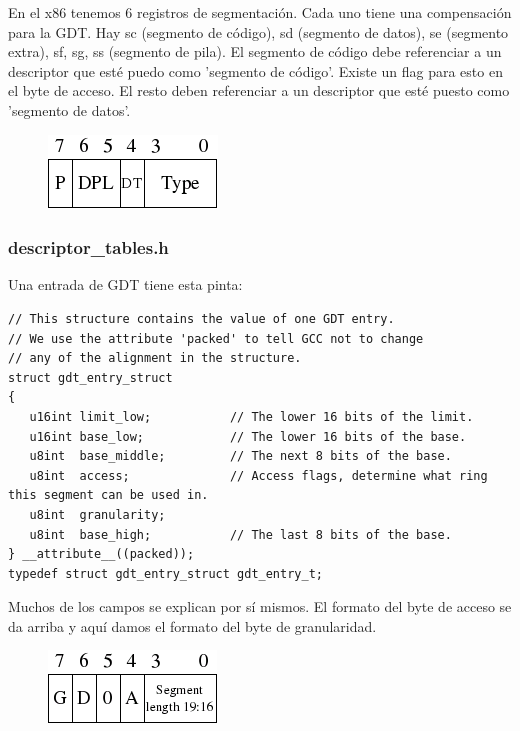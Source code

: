 \documentclass{report}
\begin{document}
En el x86 tenemos 6 registros de segmentaci\'{o}n. Cada uno tiene una compensaci\'{o}n para la GDT. Hay sc (segmento de c\'{o}digo), sd (segmento de datos), se (segmento extra), sf, sg, ss (segmento de pila). El segmento de c\'{o}digo debe referenciar a un descriptor que est\'{e} puedo como 'segmento de c\'{o}digo'. Existe un flag para esto en el byte de acceso. El resto deben referenciar a un descriptor que est\'{e} puesto como 'segmento de datos'.

\begin{figure}[htb]
\centering
\includegraphics[scale=0.5]{gdt_idt_gdt_format_2.png}
\end{figure}

\subsubsection{descriptor\_tables.h}

Una entrada de GDT tiene esta pinta:

\begin{lstlisting}
// This structure contains the value of one GDT entry.
// We use the attribute 'packed' to tell GCC not to change
// any of the alignment in the structure.
struct gdt_entry_struct
{
   u16int limit_low;           // The lower 16 bits of the limit.
   u16int base_low;            // The lower 16 bits of the base.
   u8int  base_middle;         // The next 8 bits of the base.
   u8int  access;              // Access flags, determine what ring this segment can be used in.
   u8int  granularity;
   u8int  base_high;           // The last 8 bits of the base.
} __attribute__((packed));
typedef struct gdt_entry_struct gdt_entry_t;
\end{lstlisting}

Muchos de los campos se explican por sí mismos. El formato del byte de acceso se da arriba y aquí damos el formato del byte de granularidad.

\begin{figure}[htb]
\centering
\includegraphics[scale=0.5]{gdt_idt_gdt_format_1.png}
\end{figure}
\end{document}
